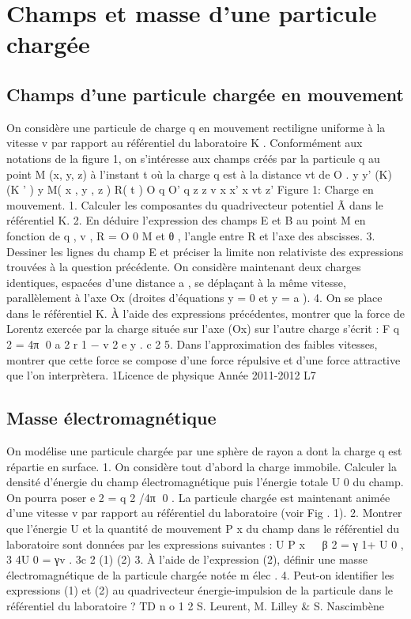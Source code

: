 
\section{Champs et masse d'une particule chargée}%
\subsection{Champs d'une particule chargée en mouvement}%
On considère une particule de charge q en mouvement rectiligne uniforme à la vitesse v par
rapport au référentiel du laboratoire K . Conformément aux notations de la figure 1, on s'intéresse
aux champs créés par la particule q au point M (x, y, z) à l'instant t où la charge q est à la distance
vt de O .
y y’
(K) (K ’ )
y
M( x , y , z )
R( t )
O
q
O’
q
z
z
v
x
x’
x
vt
z’
Figure 1: Charge en mouvement.
1. Calculer les composantes du quadrivecteur potentiel Ã dans le référentiel K.
2. En déduire l'expression des champs E et B au point M en fonction de q , v , R = O 0 M et
θ , l'angle entre R et l'axe des abscisses.
3. Dessiner les lignes du champ E et préciser la limite non relativiste des expressions trouvées
à la question précédente.
On considère maintenant deux charges identiques, espacées d'une distance a , se déplaçant à la
même vitesse, parallèlement à l'axe Ox (droites d'équations y = 0 et y = a ).
4. On se place dans le référentiel K. À l'aide des expressions précédentes, montrer que la force
de Lorentz exercée par la charge située sur l'axe (Ox) sur l'autre charge s'écrit :
F
q 2
=
4π 0 a 2
r
1 −
v 2
e y .
c 2
5. Dans l'approximation des faibles vitesses, montrer que cette force se compose d'une force
répulsive et d'une force attractive que l'on interprètera.
1Licence de physique
Année 2011-2012
L7
\subsection{Masse électromagnétique}%
On modélise une particule chargée par une sphère de rayon a dont la charge q est répartie en
surface.
1. On considère tout d'abord la charge immobile. Calculer la densité d'énergie du champ
électromagnétique puis l'énergie totale U 0 du champ. On pourra poser e 2 = q 2 /4π 0 .
La particule chargée est maintenant animée d'une vitesse v par rapport au référentiel du
laboratoire (voir Fig . 1).
2. Montrer que l'énergie U et la quantité de mouvement P x du champ dans le référentiel du
laboratoire sont données par les expressions suivantes :
U
P x


β 2
= γ 1+
U 0 ,
3
4U 0
=
γv .
3c 2
(1)
(2)
3. À l'aide de l'expression (2), définir une masse électromagnétique de la particule chargée
notée m élec .
4. Peut-on identifier les expressions (1) et (2) au quadrivecteur énergie-impulsion de la particule dans le référentiel du laboratoire ?
TD n o 1
2
S. Leurent, M. Lilley & S. Nascimbène
